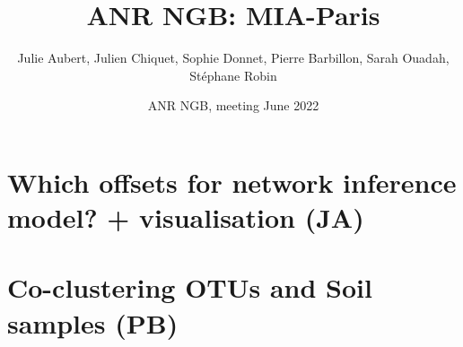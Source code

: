 \documentclass[8pt]{beamer}
\begin{document}
\title[NGB]{ANR NGB: MIA-Paris}

\author[MIA-Paris]{Julie Aubert, Julien Chiquet, Sophie Donnet, Pierre Barbillon, Sarah Ouadah, Stéphane Robin}

\date[NGB, Jun'22]{ANR NGB, meeting June 2022}

\maketitle


\section{Which offsets for network inference model? + visualisation (JA)}

\section{Co-clustering OTUs and Soil samples (PB)}

\end{document}
